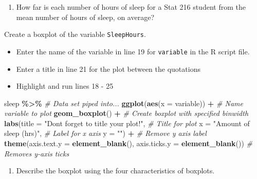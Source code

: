 \documentclass[
]{report}
\newenvironment{Shaded}{\begin{snugshade}}{\end{snugshade}}
\newcommand{\AttributeTok}[1]{\textcolor[rgb]{0.13,0.29,0.53}{#1}}
\newcommand{\CommentTok}[1]{\textcolor[rgb]{0.56,0.35,0.01}{\textit{#1}}}
\newcommand{\FunctionTok}[1]{\textcolor[rgb]{0.13,0.29,0.53}{\textbf{#1}}}
\newcommand{\NormalTok}[1]{#1}
\newcommand{\SpecialCharTok}[1]{\textcolor[rgb]{0.81,0.36,0.00}{\textbf{#1}}}
\newcommand{\StringTok}[1]{\textcolor[rgb]{0.31,0.60,0.02}{#1}}
\providecommand{\tightlist}{%
  \setlength{\itemsep}{0pt}\setlength{\parskip}{0pt}}
\begin{document}
\begin{enumerate}
\def\labelenumi{\arabic{enumi}.}
\setcounter{enumi}{3}
\tightlist
\item
  How far is each number of hours of sleep for a Stat 216 student from the mean number of hours of sleep, on average?
\end{enumerate}

\vspace{0.3in}

Create a boxplot of the variable \texttt{SleepHours}.

\begin{itemize}
\item
  Enter the name of the variable in line 19 for \texttt{variable} in the R script file.
\item
  Enter a title in line 21 for the plot between the quotations
\item
  Highlight and run lines 18 - 25
\end{itemize}

\begin{Shaded}
\begin{Highlighting}[]
\NormalTok{sleep }\SpecialCharTok{\%\textgreater{}\%} \CommentTok{\# Data set piped into...}
    \FunctionTok{ggplot}\NormalTok{(}\FunctionTok{aes}\NormalTok{(}\AttributeTok{x =}\NormalTok{ variable)) }\SpecialCharTok{+}   \CommentTok{\# Name variable to plot}
    \FunctionTok{geom\_boxplot}\NormalTok{() }\SpecialCharTok{+}  \CommentTok{\# Create boxplot with specified binwidth}
    \FunctionTok{labs}\NormalTok{(}\AttributeTok{title =} \StringTok{"Don\textquotesingle{}t forget to title your plot!"}\NormalTok{, }\CommentTok{\# Title for plot}
       \AttributeTok{x =} \StringTok{"Amount of sleep (hrs)"}\NormalTok{, }\CommentTok{\# Label for x axis}
       \AttributeTok{y =} \StringTok{""}\NormalTok{) }\SpecialCharTok{+} \CommentTok{\# Remove y axis label}
    \FunctionTok{theme}\NormalTok{(}\AttributeTok{axis.text.y =} \FunctionTok{element\_blank}\NormalTok{(), }
          \AttributeTok{axis.ticks.y =} \FunctionTok{element\_blank}\NormalTok{()) }\CommentTok{\# Removes y{-}axis ticks}
\end{Highlighting}
\end{Shaded}

\begin{enumerate}
\def\labelenumi{\arabic{enumi}.}
\setcounter{enumi}{4}
\tightlist
\item
  Describe the boxplot using the four characteristics of boxplots.
\end{enumerate}
\end{document}

